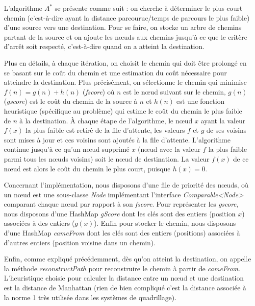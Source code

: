 \documentclass[a4paper, 10pt, french]{article}
\begin{document}
	L'algorithme $A^*$ se présente comme suit : on cherche à déterminer le plus court chemin (c'est-à-dire ayant la distance parcourue/temps de parcours le plus faible) d'une source vers une destination. Pour se faire, on stocke un arbre de chemins partant de la source et on ajoute les nœuds aux chemins jusqu'à ce que le critère d'arrêt soit respecté, c'est-à-dire quand on a atteint la destination. 
	\par\leavevmode\par
	Plus en détails, à chaque itération, on choisit le chemin qui doit être prolongé en se basant sur le coût du chemin et une estimation du coût nécessaire pour atteindre la destination. Plus précisément, on sélectionne le chemin qui minimise $f(n) = g(n) + h(n)$ ({\it fscore}) où $n$ est le nœud suivant sur le chemin, $g(n)$ ({\it gscore}) est le coût du chemin de la source à $n$ et $h(n)$ est une fonction heuristique (spécifique au problème) qui estime le coût du chemin le plus faible de $n$ à la destination. À chaque étape de l'algorithme, le nœud $x$ ayant la valeur $f(x)$ la plus faible est retiré de la file d'attente, les valeurs $f$ et $g$ de ses voisins sont mises à jour et ces voisins sont ajoutés à la file d'attente. L'algorithme continue jusqu'à ce qu'un nœud supprimé $x$ (nœud avec la valeur $f$ la plus faible parmi tous les nœuds voisins) soit le nœud de destination. La valeur $f(x)$ de ce nœud est alors le coût du chemin le plus court, puisque $h(x) = 0$.
	\par\leavevmode\par
	Concernant l'implémentation, nous disposons d'une file de priorité des nœuds, où un nœud est une sous-classe {\it Node} implémentant l'interface {\it Comparable<Node>} comparant chaque nœud par rapport à son {\it fscore}. Pour représenter les {\it gscore}, nous disposons d'une HashMap {\it gScore} dont les clés sont des entiers (position $x$) associées à des entiers ($g(x)$). Enfin pour stocker le chemin, nous disposons d'une HashMap {\it cameFrom} dont les clés sont des entiers (positions) associées à d'autres entiers (position voisine dans un chemin). 
	\par\leavevmode\par	
	Enfin, comme expliqué précédemment, dès qu'on atteint la destination, on appelle la méthode {\it reconstructPath} pour reconstruire le chemin à partir de {\it cameFrom}. L'heuristique choisie pour calculer la distance entre un nœud et une destination est la distance de Manhattan (rien de bien compliqué c'est la distance associée à la norme 1 très utilisée dans les systèmes de quadrillage).
	
\end{document}

